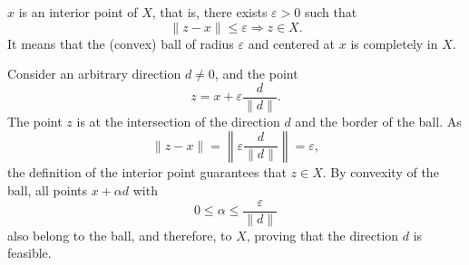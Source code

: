 
    $x$ is an interior point of $X$, that is, there exists
$\varepsilon > 0$ such that
\[
\|z-x\| \leq \varepsilon \Longrightarrow z \in X.
\]
It means that the (convex) ball of radius $\varepsilon$ and centered
at $x$ is completely in $X$.

Consider an arbitrary direction $d\neq 0$, and the point
\[
z=x+\varepsilon \frac{d}{\parallel d \parallel}.
\]
The point $z$ is at the intersection of the direction $d$ and the border
of the ball.
As
\[
\|z-x\| = \left\|\varepsilon \frac{d}{\parallel d \parallel}\right\| = \varepsilon,
\]
the definition of the interior point guarantees that  $z \in X$. By
convexity of the ball, all points $x + \alpha d$ with
\[
0 \leq \alpha \leq \frac{\varepsilon}{\|d\|}
\]
also belong to the ball, and therefore, to $X$, proving that the
direction $d$ is feasible.

\begin{center}
\end{center}
